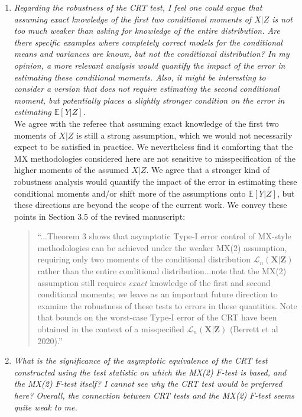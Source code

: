\documentclass[12pt]{article}
\begin{document}
\begin{enumerate}
	
	
	\item \textsl{Regarding the robustness of the CRT test, I feel one could argue that assuming exact knowledge of the first two conditional moments of $X | Z$ is not too much weaker than asking for knowledge of the entire distribution. Are there specific examples where completely correct models for the conditional means and variances are known, but not the conditional distribution? In my opinion, a more relevant analysis would quantify the impact of the error in estimating these conditional moments. Also, it might be interesting to consider a version that does not require estimating the second conditional moment, but potentially places a slightly stronger condition on the error in estimating $\mathbb E[Y | Z]$.}\\
	
	We agree with the referee that assuming exact knowledge of the first two moments of $X|Z$ is still a strong assumption, which we would not necessarily expect to be satisfied in practice. We nevertheless find it comforting that the MX methodologies considered here are not sensitive to misspecification of the higher moments of the assumed $X|Z$. We agree that a stronger kind of robustness analysis would quantify the impact of the error in estimating these conditional moments and/or shift more of the assumptions onto $\mathbb E[Y|Z]$, but these directions are beyond the scope of the current work. We convey these points in Section 3.5 of the revised manuscript:
	\begin{quote}
	``...Theorem 3 shows that asymptotic Type-I error control of MX-style methodologies can be achieved under the weaker MX(2) assumption, requiring only two moments of the conditional distribution $\mathcal L_n(\bm X | \bm Z)$ rather than the entire conditional distribution...note that the MX(2) assumption still requires \textit{exact} knowledge of the first and second conditional moments; we leave as an important future direction to examine the robustness of these tests to errors in these quantities. Note that bounds on the worst-case Type-I error of the CRT have been obtained in the context of a misspecified $\mathcal L_n(\bm X|\bm Z)$ (Berrett et al 2020).''
	\end{quote}

	\item \textsl{What is the significance of the asymptotic equivalence of the CRT test constructed using the test statistic on which the MX(2) $F$-test is based, and the MX(2) $F$-test itself? I cannot see why the CRT test would be preferred here? Overall, the connection between CRT tests and the MX(2) $F$-test seems quite weak to me.} \\
	

\end{enumerate}
\end{document}
